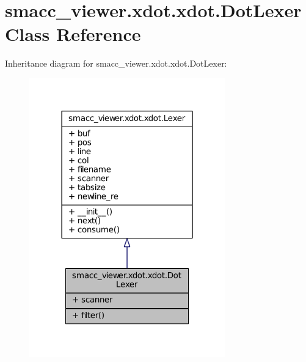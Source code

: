 \hypertarget{classsmacc__viewer_1_1xdot_1_1xdot_1_1DotLexer}{}\section{smacc\+\_\+viewer.\+xdot.\+xdot.\+Dot\+Lexer Class Reference}
\label{classsmacc__viewer_1_1xdot_1_1xdot_1_1DotLexer}


Inheritance diagram for smacc\+\_\+viewer.\+xdot.\+xdot.\+Dot\+Lexer\+:
\nopagebreak
\begin{figure}[H]
\begin{center}
\leavevmode
\includegraphics[width=240pt]{classsmacc__viewer_1_1xdot_1_1xdot_1_1DotLexer__inherit__graph}
\end{center}
\end{figure}


